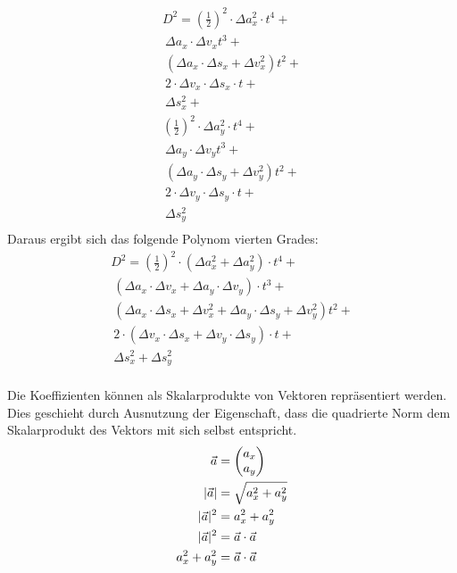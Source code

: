 \begin{multline}
    D^2 = (\frac{1}{2})^2 \cdot \Delta a_x^2 \cdot t^4 +\\\
    \Delta a_x \cdot \Delta v_x t^3 +\\\
    (\Delta a_x \cdot \Delta s_x + \Delta v_x^2) t^2 +\\\
    2 \cdot \Delta v_x \cdot \Delta s_x \cdot t +\\\
    \Delta s_x^2 +\\
    (\frac{1}{2})^2 \cdot \Delta a_y^2 \cdot t^4 +\\\
    \Delta a_y \cdot \Delta v_y t^3 +\\\
    (\Delta a_y \cdot \Delta s_y + \Delta v_y^2) t^2 +\\\
    2 \cdot \Delta v_y \cdot \Delta s_y \cdot t +\\\
    \Delta s_y^2\\
\end{multline}
Daraus ergibt sich das folgende Polynom vierten Grades:
\begin{multline}
    D^2 = (\frac{1}{2})^2 \cdot (\Delta a_x^2 + \Delta a_y^2) \cdot t^4 +\\\
    (\Delta a_x \cdot \Delta v_x + \Delta a_y \cdot \Delta v_y) \cdot t^3 +\\\
    (\Delta a_x \cdot \Delta s_x + \Delta v_x^2 + \Delta a_y \cdot \Delta s_y + \Delta v_y^2) t^2 +\\\
    2 \cdot (\Delta v_x \cdot \Delta s_x + \Delta v_y \cdot \Delta s_y) \cdot t +\\\
    \Delta s_x^2 + \Delta s_y^2\label{eq:dynamic_object_collision_event:03}\\\
\end{multline}

Die Koeffizienten können als Skalarprodukte von Vektoren repräsentiert werden. Dies geschieht durch Ausnutzung der
Eigenschaft, dass die quadrierte Norm dem Skalarprodukt des Vektors mit sich selbst entspricht.
\begin{align}
    \vec{a} &= \begin{pmatrix}a_x\\a_y\end{pmatrix}\\
    \lvert \vec{a} \rvert &= \sqrt{a_x^2 + a_y^2}\\
    \lvert \vec{a} \rvert^2 &= a_x^2 + a_y^2\\
    \lvert \vec{a} \rvert^2 &= \vec{a} \cdot \vec{a}\\
    a_x^2 + a_y^2 &= \vec{a} \cdot \vec{a}\label{eq:dynamic_object_collision_event:04}
 \end{align}

